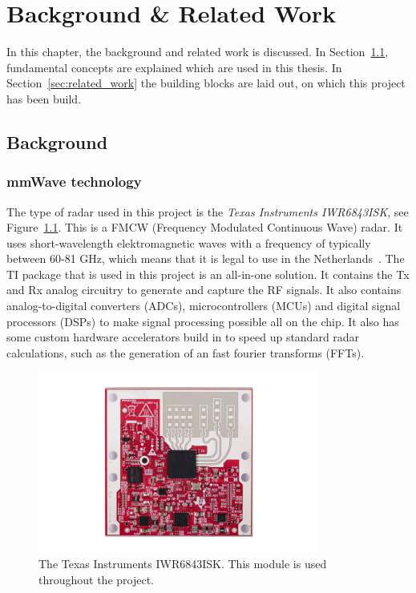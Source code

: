 \chapter{Background \& Related Work}
\label{chp:background}

In this chapter, the background and related work is discussed. In Section~\ref{sec:background}, fundamental concepts are explained which are used in this thesis. In Section~\ref{sec:related_work} the building blocks are laid out, on which this project has been build.

\section{Background}
\label{sec:background}
\subsection{mmWave technology}
The type of radar used in this project is the \emph{Texas Instruments IWR6843ISK}, see Figure~\ref{fig:iwr6843isk}. This is a FMCW (Frequency Modulated Continuous Wave) radar. It uses short-wavelength elektromagnetic waves with a frequency of typically between 60-81 GHz, which means that it is legal to use in the Netherlands~\cite{freq_plan}. The TI package that is used in this project is an all-in-one solution. It contains the Tx and Rx analog circuitry to generate and capture the RF signals. It also contains analog-to-digital converters (ADCs), microcontrollers (MCUs) and digital signal processors (DSPs) to make signal processing possible all on the chip. It also has some custom hardware accelerators build in to speed up standard radar calculations, such as the generation of an fast fourier transforms (FFTs).

\begin{figure}[t]
\centering
\includegraphics[width=.5\textwidth]{figures/iwr6843isk.jpg}
\caption{The Texas Instruments IWR6843ISK. This module is used throughout the project.}
\label{fig:iwr6843isk}
\end{figure}

